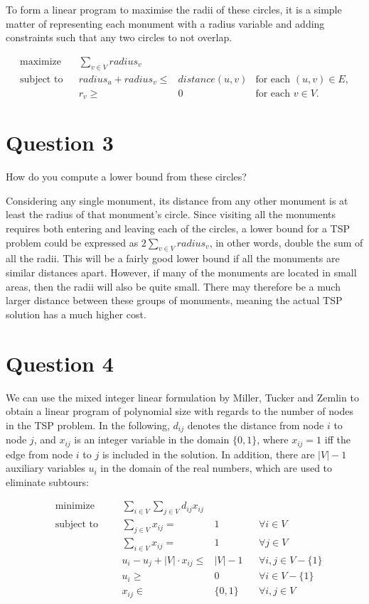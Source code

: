 \documentclass[a4paper, 10pt, oneside, article]{memoir}
\begin{document}
To form a linear program to maximise the radii of these circles, it is a simple matter of representing each monument with a radius variable and adding constraints such that any two circles to not overlap.

\begin{align*}
  \text{maximize} && \sum_{v\in V} radius_{v} \\
  \text{subject to} && radius_{u} + radius_{v} \leq{}& distance(u,v) & \text{for each $(u,v) \in E$}, \\
                    && r_{v} \geq{}& 0 & \text{for each $v \in V$}.
\end{align*}

\section*{Question 3}
How do you compute a lower bound from these circles?

Considering any single monument, its distance from any other monument is at least the radius of that monument's circle. Since visiting all the monuments requires both entering and leaving each of the circles, a lower bound for a TSP problem could be expressed as $2 \sum_{v \in V} radius_{v}$, in other words, double the sum of all the radii.
This will be a fairly good lower bound if all the monuments are similar distances apart. However, if many of the monuments are located in small areas, then the radii will also be quite small. There may therefore be a much larger distance between these groups of monuments, meaning the actual TSP solution has a much higher cost.


\section*{Question 4}

We can use the mixed integer linear formulation by Miller, Tucker and
Zemlin to obtain a linear program of polynomial size with regards to
the number of nodes in the TSP problem. In the following, $d_{ij}$
denotes the distance from node $i$ to node $j$, and $x_{ij}$ is an
integer variable in the domain $\{0, 1\}$, where $x_{ij} = 1$ iff the
edge from node $i$ to $j$ is included in the solution. In addition,
there are $|V|-1$ auxiliary variables $u_i$ in the domain of the real
numbers, which are used to eliminate subtours:

\begin{align*}
  &\text{minimize} &&& \sum_{i\in V} \sum_{j \in V} d_{ij} x_{ij} \\
  &\text{subject to} &&& \sum_{j \in V} x_{ij} ={}& 1 && \forall i \in V \\
  &                  &&& \sum_{i \in V} x_{ij} ={}& 1 && \forall j \in V \\
  &                  &&& u_i - u_j + |V| \cdot x_{ij} \leq{}& |V| - 1 && \forall i,j \in V - \{1\}  \\
  &                  &&& u_i \geq{}& 0 && \forall i \in V - \{1\} \\
  &                  &&& x_{ij} \in{}& \{0, 1\} && \forall i,j \in V
\end{align*}
\end{document}
